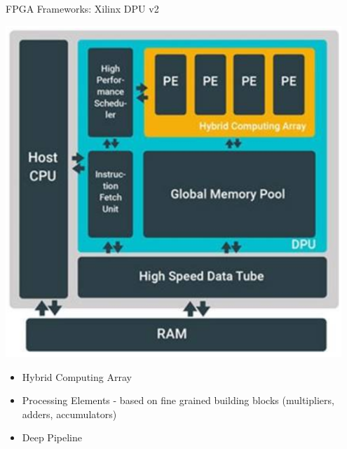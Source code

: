 \begin{frame}{FPGA Frameworks: Xilinx DPU v2}
	\begin{minipage}{0.4\textwidth}
		\centering
		\includegraphics[width=0.95\textwidth]{../Images/Hardware/dpu-v2-architecture.png}\\
	\end{minipage}%
	\begin{minipage}{0.6\textwidth}
		\begin{itemize}
			\item Hybrid Computing Array
			\item Processing Elements - based on fine grained building blocks (multipliers, adders, accumulators)
			\item Deep Pipeline
		\end{itemize}
	\end{minipage}
\end{frame}

